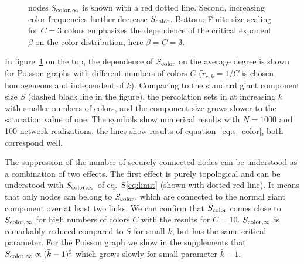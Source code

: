 \documentclass[aps, pre, twocolumn, a4paper, floatfix]{revtex4}
\begin{document}
{\begin{figure}[htb]
\begin{center}
{    nodes $S_{{\rm color},\infty}$ is shown with a red dotted line. Second, increasing color frequencies 
    further decrease $S_{\rm color}$. Bottom: Finite size scaling for $C=3$ colors emphasizes the dependence 
    of the critical exponent $\beta$ on the color distribution, here $\beta=C=3$.}
    \label{fig:poisson}
\end{center}
\end{figure}
In figure~\ref{fig:poisson} on the top, the dependence of $S_{\rm color}$ on the average degree is shown for Poisson graphs 
with different numbers of colors $C$ (${\tilde r}_{c,k}=1/C$ is chosen homogeneous and independent of $k$). 
Comparing to the standard giant component size $S$ (dashed black line in the figure), 
the percolation sets in at increasing $\bar k$ with smaller numbers of colors, and the component size grows 
slower to the saturation value of one. The symbols show numerical results with $N=1000$ and 100 network realizations, 
the lines show results of equation~\ref{eq:s_color}, both correspond well. 

The suppression of the number of securely connected nodes can be understood as a combination of two effects. 
The first effect is purely topological and can be understood with $S_{{\rm color},\infty}$ of eq.~S\ref{eq:limit}
(shown with dotted red line). It means that only nodes can belong to $S_{\rm color}$, which are connected 
to the normal giant component over at least two links. We can confirm that 
$S_{\rm color}$ comes close to $S_{{\rm color},\infty}$ for high numbers of colors $C$ with the results for $C=10$.
$S_{{\rm color},\infty}$ is remarkably reduced compared to $S$ for small $k$, but has the same critical parameter. 
For the Poisson graph we show in the supplements that $S_{\rm color,\infty}\propto ({\bar k}-1)^2$ 
which grows slowly for small parameter ${\bar k}-1$. 

}
\end{document}
